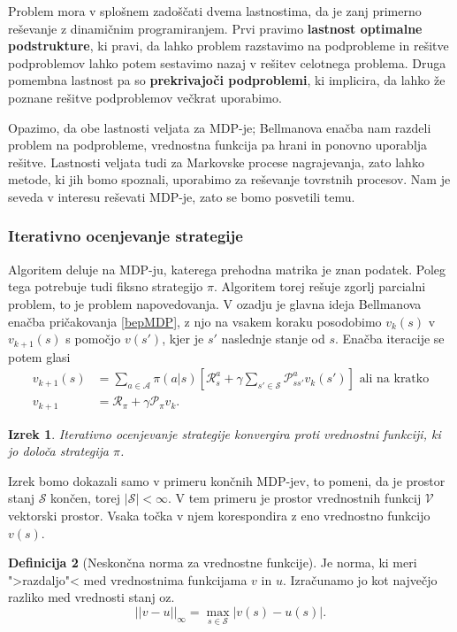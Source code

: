 \documentclass[12pt,a4paper]{amsart}
\theoremstyle{definition} %
\newtheorem{definicija}{Definicija}[section]
\theoremstyle{plain} %
\newtheorem{izrek}[definicija]{Izrek}
\begin{document}
Problem mora v splošnem zadoščati dvema lastnostima, da je zanj primerno reševanje z dinamičnim 
programiranjem. Prvi pravimo \textbf{lastnost optimalne podstrukture}, ki pravi, da lahko problem 
razstavimo na podprobleme in rešitve podproblemov lahko potem sestavimo nazaj v rešitev celotnega 
problema. Druga pomembna lastnost pa so \textbf{prekrivajoči podproblemi}, ki implicira, da lahko 
že poznane rešitve podproblemov večkrat uporabimo.

Opazimo, da obe lastnosti veljata za MDP-je; Bellmanova enačba nam razdeli problem na 
podprobleme, vrednostna funkcija pa hrani in ponovno uporablja rešitve. Lastnosti veljata tudi 
za Markovske procese nagrajevanja, zato lahko metode, ki jih bomo spoznali, uporabimo za reševanje
tovrstnih procesov. Nam je seveda v interesu reševati MDP-je, zato se bomo posvetili temu.

\subsubsection{Iterativno ocenjevanje strategije}
Algoritem deluje na MDP-ju, katerega prehodna matrika je znan podatek. Poleg tega potrebuje tudi 
fiksno strategijo $\pi$. Algoritem torej rešuje zgorlj parcialni problem, to je problem 
napovedovanja. V ozadju je glavna ideja Bellmanova enačba pričakovanja \eqref{bepMDP}, z njo na 
vsakem koraku posodobimo $v_k(s)$ v $v_{k+1}(s)$ s pomočjo $v(s')$, kjer je $s'$ naslednje stanje od 
$s$. Enačba iteracije se potem glasi 
\begin{align*}
    v_{k+1}(s) &= \sum_{a \in \mathcal{A}} \pi(a|s) \left[ \mathcal{R}_s^a + 
        \gamma \sum_{s' \in \mathcal{S}} \mathcal{P}_{ss'}^a v_k(s') \right] \text{ ali na kratko}\\
    v_{k+1} &= \mathcal{R}_\pi + \gamma \mathcal{P}_\pi v_k.
\end{align*}

\begin{izrek}\label{ios}
    Iterativno ocenjevanje strategije konvergira proti vrednostni funkciji, ki jo določa strategija 
    $\pi$.
\end{izrek}

Izrek bomo dokazali samo v primeru končnih MDP-jev, to pomeni, da je prostor stanj $\mathcal{S}$ 
končen, torej $|\mathcal{S}| < \infty$. V tem primeru je prostor vrednostnih funkcij $\mathcal{V}$
vektorski prostor. Vsaka točka v njem korespondira z eno vrednostno funkcijo $v(s)$.

\begin{definicija}[Neskončna norma za vrednostne funkcije]
    Je norma, ki meri ">razdaljo"< med vrednostnima funkcijama $v$ in $u$. Izračunamo jo kot 
    največjo razliko med vrednosti stanj oz. 
    $$
    ||v - u||_\infty = \max_{s \in \mathcal{S}} |v(s) - u(s)|.
    $$
\end{definicija}
\end{document}
